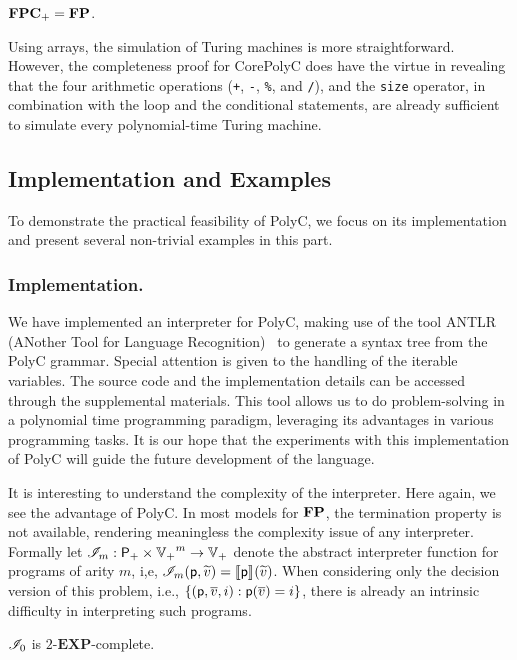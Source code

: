 \documentclass[runningheads]{llncs}
\begin{document}
\begin{theorem}
\label{thm:poly-main}
$\mathbf{FPC}_{+}=\mathbf{FP}$.
\end{theorem}

Using arrays, the simulation of Turing machines is more straightforward.
However, the completeness proof for CorePolyC does have the virtue in revealing that the four arithmetic operations (\texttt{+}, \texttt{-}, \texttt{\%}, and \texttt{/}), and the \texttt{size} operator, in combination with the loop and the conditional statements, are already sufficient to simulate every polynomial-time Turing machine.

\subsection{Implementation and Examples}\label{sec:example_PolyC}
To demonstrate the practical feasibility of PolyC, we focus on its implementation and present several non-trivial examples in this part.

\subsubsection{Implementation.}
We have implemented an interpreter for PolyC, making use of the tool ANTLR (ANother Tool for Language Recognition)~\cite{parr1995antlr} to generate a syntax tree from the PolyC grammar.
Special attention is given to the handling of the iterable variables.
The source code and the implementation details can be accessed through the supplemental materials.
This tool allows us to do problem-solving in a polynomial time programming paradigm, leveraging its advantages in various programming tasks.
It is our hope that the experiments with this implementation of PolyC will guide the future development of the language.

It is interesting to understand the complexity of the interpreter.
Here again, we see the advantage of PolyC.
In most models for $\mathbf{FP}$, the termination property is not available, rendering meaningless the complexity issue of any interpreter.
Formally let $\mathscr{I}_{m}:\mathsf{P}_{+}\times{\mathbb{V}_{+}}^{m}\to\mathbb{V}_{+}$ denote the abstract interpreter function for programs of arity $m$, i,e,
$\mathscr{I}_m(\mathsf{p},\widetilde{v})=\llbracket\mathsf{p}\rrbracket_{}(\widetilde{v})$.
When considering only the decision version of this problem, i.e., $\{(\mathsf{p},\overline{v},i): \mathsf{p}(\overline{v})=i\}$, there is already an intrinsic difficulty in interpreting such programs.

\begin{proposition}
\label{prop:poly-encode}
$\mathscr{I}_0$ is $2$-$\mathbf{EXP}$-complete.
\end{proposition}
\end{document}
